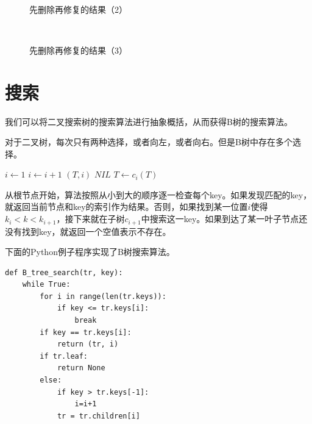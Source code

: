 \documentclass{ctexart}
\begin{document}
\begin{figure}[htbp]
  \centering
   \\
  \caption{先删除再修复的结果（2）} \label{fig:result-del-fp2}
\end{figure}

\begin{figure}[htbp]
  \centering
   \\
  \caption{先删除再修复的结果（3）} \label{fig:result-del-fp3}
\end{figure}


\section{搜索}

我们可以将二叉搜索树的搜索算法进行抽象概括，从而获得B树的搜索算法。

对于二叉树，每次只有两种选择，或者向左，或者向右。但是B树中存在多个选择。

\begin{algorithmic}[1]
  \Loop
    \State $i \gets 1$
      \State $i \gets i+1$
    \EndWhile
      \State \Return $(T, i)$
    \EndIf
      \State \Return $NIL$ 
    \Else
      \State $T \gets c_i(T)$
    \EndIf
  \EndLoop
\EndFunction
\end{algorithmic}

从根节点开始，算法按照从小到大的顺序逐一检查每个key。如果发现匹配的key，就返回当前节点和key的索引作为结果。否则，如果找到某一位置$i$使得$k_i < k < k_{i+1}$，接下来就在子树$c_{i+1}$中搜索这一key。如果到达了某一叶子节点还没有找到key，就返回一个空值表示不存在。

下面的Python例子程序实现了B树搜索算法。

\lstset{language=Python}
\begin{lstlisting}
def B_tree_search(tr, key):
    while True:
        for i in range(len(tr.keys)):
            if key <= tr.keys[i]:
                break
        if key == tr.keys[i]:
            return (tr, i)
        if tr.leaf:
            return None
        else:
            if key > tr.keys[-1]:
                i=i+1
            tr = tr.children[i]
\end{lstlisting}
\end{document}
